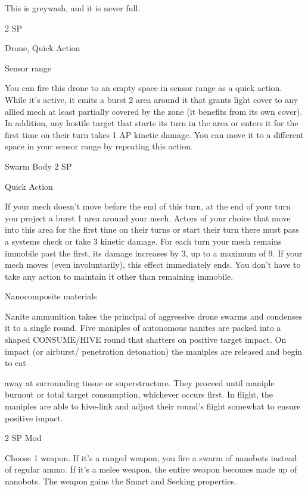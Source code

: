 This is greywash, and it is never full.    

2 SP
 
Drone, Quick Action
 

Sensor range
 
You can fire this drone to an empty space in sensor range as a quick action. While it’s active, it  
emits a burst 2 area around it that grants light cover to any allied mech at least partially covered  
by the zone (it benefits from its own cover). In addition, any hostile target that starts its turn in the  
area or enters it for the first time on their turn takes 1 AP kinetic damage. You can move it to a  
different space in your sensor range by repeating this action.
 

Swarm Body  
2 SP
 
Quick Action
 

                                                                                                                     


If your mech doesn’t move before the end of this turn, at the end of your turn you project a burst  
1 area around your mech. Actors of your choice that move into this area for the first time on their  
turns or start their turn there must pass a systems check or take 3 kinetic damage. For each turn  
your mech remains immobile past the first, its damage increases by 3, up to a maximum of 9. If  
your mech moves (even involuntarily), this effect immediately ends. You don’t have to take any  
action to maintain it other than remaining immobile.
 

Nanocomposite materials  

Nanite ammunition takes the principal of aggressive drone swarms and condenses it to a single round. Five  
maniples of autonomous nanites are packed into a shaped CONSUME/HIVE round that shatters on positive  
target impact. On impact (or airburst/ penetration detonation) the maniples are released and begin to eat  

away at surrounding tissue or superstructure. They proceed until maniple burnout or total target  
consumption, whichever occurs first. In flight, the maniples are able to hive-link and adjust their round’s  
flight somewhat to ensure positive impact.    

2 SP  
Mod  

Choose 1 weapon. If it’s a ranged weapon, you fire a swarm of nanobots instead of regular  
ammo. If it’s a melee weapon, the entire weapon becomes made up of nanobots. The weapon  
gains the Smart and Seeking properties.
 

